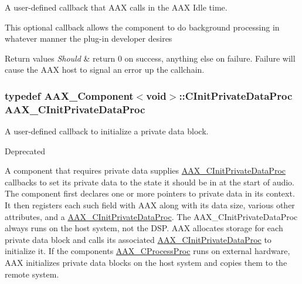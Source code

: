 A user-\/defined callback that A\+A\+X calls in the A\+A\+X Idle time. 

This optional callback allows the component to do background processing in whatever manner the plug-\/in developer desires


\begin{DoxyRetVals}{Return values}
{\em Should} & return 0 on success, anything else on failure. Failure will cause the A\+A\+X host to signal an error up the callchain. \\
\hline
\end{DoxyRetVals}
\hypertarget{a00163_adfb5d89b9d957c541fc98fe42bc050c4}{}
\subsubsection[{A\+A\+X\+\_\+\+C\+Init\+Private\+Data\+Proc}]{\setlength{\rightskip}{0pt plus 5cm}typedef {\bf A\+A\+X\+\_\+\+Component}$<$void$>$\+::C\+Init\+Private\+Data\+Proc {\bf A\+A\+X\+\_\+\+C\+Init\+Private\+Data\+Proc}}\label{a00163_adfb5d89b9d957c541fc98fe42bc050c4}


A user-\/defined callback to initialize a private data block. 

\begin{DoxyRefDesc}{Deprecated}
\item[\hyperlink{a00386__deprecated000003}{Deprecated}]\end{DoxyRefDesc}


A component that requires private data supplies \hyperlink{a00163_adfb5d89b9d957c541fc98fe42bc050c4}{A\+A\+X\+\_\+\+C\+Init\+Private\+Data\+Proc} callbacks to set its private data to the state it should be in at the start of audio. The component first declares one or more pointers to private data in its context. It then registers each such field with A\+A\+X along with its data size, various other attributes, and a \hyperlink{a00163_adfb5d89b9d957c541fc98fe42bc050c4}{A\+A\+X\+\_\+\+C\+Init\+Private\+Data\+Proc}. The A\+A\+X\+\_\+\+C\+Init\+Private\+Data\+Proc always runs on the host system, not the D\+S\+P. A\+A\+X allocates storage for each private data block and calls its associated \hyperlink{a00163_adfb5d89b9d957c541fc98fe42bc050c4}{A\+A\+X\+\_\+\+C\+Init\+Private\+Data\+Proc} to initialize it. If the component\textquotesingle{}s \hyperlink{a00163_ad6dd5e1aa5bd2f8462966685e3b26a6e}{A\+A\+X\+\_\+\+C\+Process\+Proc} runs on external hardware, A\+A\+X initializes private data blocks on the host system and copies them to the remote system.

